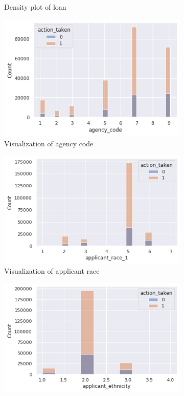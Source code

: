 \documentclass{jpp}
\begin{document}
\begin{figure}
\begin{subfigure}{.5\textwidth}
  \caption{Density plot of loan }\label{EDA3}
\end{subfigure}
\begin{subfigure}{.5\textwidth}
  \centering
  \includegraphics[width=.9\linewidth]{EDA4.png}  
  \caption{Visualization of agency code}\label{EDA4}
\end{subfigure}
\begin{subfigure}{.5\textwidth}
  \centering
  \includegraphics[width=.9\linewidth]{EDA5.png}  
  \caption{Visualization of applicant race}\label{EDA5}
\end{subfigure}
\begin{subfigure}{.5\textwidth}
  \centering
  \includegraphics[width=.9\linewidth]{EDA6.png}  

\end{subfigure}
\end{figure}
\end{document}
